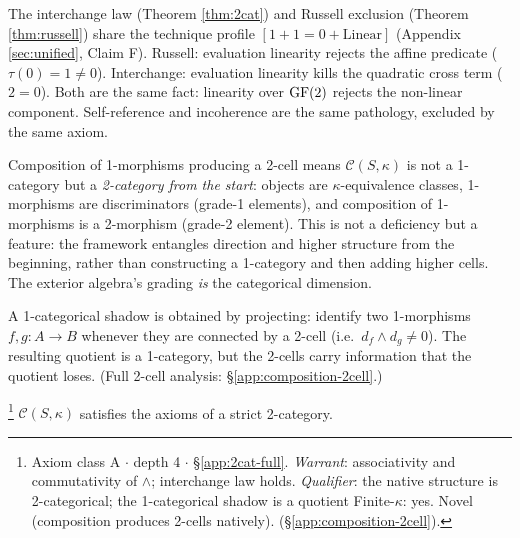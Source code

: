 \begin{remark}
\label{rem:interchange-russell}
The interchange law (Theorem \ref{thm:2cat}) and
Russell exclusion (Theorem \ref{thm:russell}) share
the technique profile $[1{+}1{=}0 + \text{Linear}]$
(Appendix \ref{sec:unified}, Claim F). Russell:
evaluation linearity rejects the affine predicate
($\tau(0) = 1 \neq 0$). Interchange: evaluation
linearity kills the quadratic cross term ($2 = 0$).
Both are the same fact: linearity over $\operatorname{GF}(2)$
rejects the non-linear component. Self-reference
and incoherence are the same pathology, excluded
by the same axiom.
\end{remark}

\begin{remark}
\label{rem:2cat}
Composition of 1-morphisms producing a 2-cell means
$\mathcal{C}(S,\kappa)$ is not a 1-category but a
\emph{2-category from the start}: objects are
$\kappa$-equivalence classes, 1-morphisms are
discriminators (grade-1 elements), and composition of
1-morphisms is a 2-morphism (grade-2 element). This is
not a deficiency but a feature: the framework entangles
direction and higher structure from the beginning,
rather than constructing a 1-category and then adding
higher cells. The exterior algebra's grading \emph{is}
the categorical dimension.

A 1-categorical shadow is obtained by projecting: identify
two 1-morphisms $f, g: A \to B$ whenever they are
connected by a 2-cell (i.e.\ $d_f \wedge d_g \neq 0$).
The resulting quotient is a 1-category, but the 2-cells
carry information that the quotient loses.
(Full 2-cell analysis: \S\ref{app:composition-2cell}.)
\end{remark}

\begin{theorem}\label{thm:cat-axioms}\footnote{Axiom class \textsf{A} $\cdot$ depth 4 $\cdot$ \S\ref{app:2cat-full}.  \emph{Warrant}: associativity and commutativity of $\wedge$; interchange law holds. \emph{Qualifier}: the native structure is 2-categorical; the 1-categorical shadow is a quotient Finite-$\kappa$: yes. Novel (composition produces 2-cells natively). (\S\ref{app:composition-2cell}).}
$\mathcal{C}(S,\kappa)$ satisfies the axioms of a
strict 2-category.
\end{theorem}

